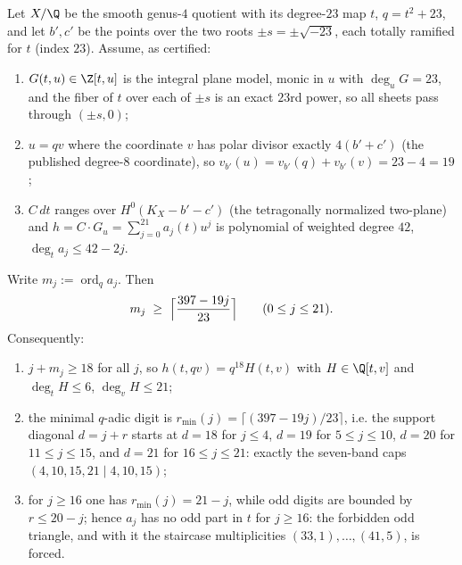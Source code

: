 
\begin{proposition}
\label{prop:band-law-proof}
Let $X/\Q$ be the smooth genus-$4$ quotient with its degree-$23$ map $t$,
$q=t^{2}+23$, and let $b',c'$ be the points over the two roots
$\pm s=\pm\sqrt{-23}$, each totally ramified for $t$ (index $23$).
Assume, as certified:
\begin{enumerate}
\item[(i)] $G(t,u)\in\Z[t,u]$ is the integral plane model, monic in $u$
  with $\deg_u G=23$, and the fiber of $t$ over each of $\pm s$ is an
  exact $23$rd power, so all sheets pass through $(\pm s,0)$;
\item[(ii)] $u=qv$ where the coordinate $v$ has polar divisor exactly
  $4(b'+c')$ (the published degree-$8$ coordinate), so
  $v_{b'}(u)=v_{b'}(q)+v_{b'}(v)=23-4=19$;
\item[(iii)] $C\,dt$ ranges over $H^{0}(K_X-b'-c')$ (the tetragonally
  normalized two-plane) and $h=C\cdot G_u=\sum_{j=0}^{21}a_j(t)u^{j}$ is
  polynomial of weighted degree $42$, $\deg_t a_j\le 42-2j$.
\end{enumerate}
Write $m_j:=\operatorname{ord}_q a_j$. Then
\[
m_j\;\ge\;\Bigl\lceil\frac{397-19j}{23}\Bigr\rceil
\qquad(0\le j\le 21).
\]
Consequently:
\begin{enumerate}
\item[(a)] $j+m_j\ge 18$ for all $j$, so $h(t,qv)=q^{18}H(t,v)$ with
  $H\in\Q[t,v]$ and $\deg_t H\le 6$, $\deg_v H\le 21$;
\item[(b)] the minimal $q$-adic digit is
  $r_{\min}(j)=\lceil(397-19j)/23\rceil$, i.e. the support diagonal
  $d=j+r$ starts at $d=18$ for $j\le 4$, $d=19$ for $5\le j\le 10$,
  $d=20$ for $11\le j\le 15$, and $d=21$ for $16\le j\le 21$: exactly
  the seven-band caps $(4,10,15,21\mid 4,10,15)$;
\item[(c)] for $j\ge 16$ one has $r_{\min}(j)=21-j$, while odd digits
  are bounded by $r\le 20-j$; hence $a_j$ has no odd part in $t$ for
  $j\ge 16$: the forbidden odd triangle, and with it the staircase
  multiplicities $(33,1),\dots,(41,5)$, is forced.
\end{enumerate}
\end{proposition}

